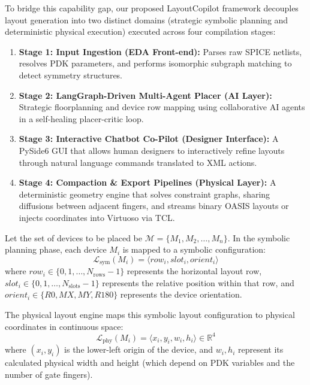 To bridge this capability gap, our proposed LayoutCopilot framework decouples layout generation into two distinct domains (strategic symbolic planning and deterministic physical execution) executed across four compilation stages:
\begin{enumerate}
    \item \textbf{Stage 1: Input Ingestion (EDA Front-end):} Parses raw SPICE netlists, resolves PDK parameters, and performs isomorphic subgraph matching to detect symmetry structures.
    \item \textbf{Stage 2: LangGraph-Driven Multi-Agent Placer (AI Layer):} Strategic floorplanning and device row mapping using collaborative AI agents in a self-healing placer-critic loop.
    \item \textbf{Stage 3: Interactive Chatbot Co-Pilot (Designer Interface):} A PySide6 GUI that allows human designers to interactively refine layouts through natural language commands translated to XML actions.
    \item \textbf{Stage 4: Compaction \& Export Pipelines (Physical Layer):} A deterministic geometry engine that solves constraint graphs, sharing diffusions between adjacent fingers, and streams binary OASIS layouts or injects coordinates into Virtuoso via TCL.
\end{enumerate}

Let the set of devices to be placed be $\mathcal{M} = \{M_1, M_2, \dots, M_n\}$. In the symbolic planning phase, each device $M_i$ is mapped to a symbolic configuration:
\begin{equation}
    \mathcal{L}_{\text{sym}}(M_i) = \langle row_i, slot_i, orient_i \rangle
\end{equation}
where $row_i \in \{0, 1, \dots, N_{\text{rows}}-1\}$ represents the horizontal layout row, $slot_i \in \{0, 1, \dots, N_{\text{slots}}-1\}$ represents the relative position within that row, and $orient_i \in \{R0, MX, MY, R180\}$ represents the device orientation.

The physical layout engine maps this symbolic layout configuration to physical coordinates in continuous space:
\begin{equation}
    \mathcal{L}_{\text{phy}}(M_i) = \langle x_i, y_i, w_i, h_i \rangle \in \mathbb{R}^4
  \label{eq:physical_mapping}
\end{equation}
where $(x_i, y_i)$ is the lower-left origin of the device, and $w_i, h_i$ represent its calculated physical width and height (which depend on PDK variables and the number of gate fingers). 

